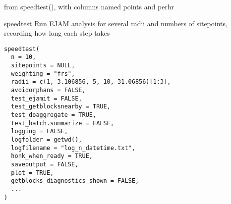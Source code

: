 \documentclass[a4paper]{book}
\begin{document}
%
\begin{Arguments}
\begin{ldescription}
\item[\code{speedtable}] from speedtest(), with columns named points and perhr
\end{ldescription}
\end{Arguments}
%
\begin{SeeAlso}\relax
{}
\end{SeeAlso}
%
\begin{Description}\relax
speedtest
Run EJAM analysis for several radii and numbers of sitepoints,
recording how long each step takes
\end{Description}
%
\begin{Usage}
\begin{verbatim}
speedtest(
  n = 10,
  sitepoints = NULL,
  weighting = "frs",
  radii = c(1, 3.106856, 5, 10, 31.06856)[1:3],
  avoidorphans = FALSE,
  test_ejamit = FALSE,
  test_getblocksnearby = TRUE,
  test_doaggregate = TRUE,
  test_batch.summarize = FALSE,
  logging = FALSE,
  logfolder = getwd(),
  logfilename = "log_n_datetime.txt",
  honk_when_ready = TRUE,
  saveoutput = FALSE,
  plot = TRUE,
  getblocks_diagnostics_shown = FALSE,
  ...
)
\end{verbatim}
\end{Usage}
%
\end{document}
